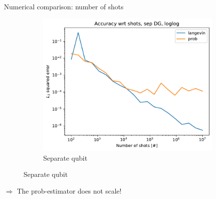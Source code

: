 \documentclass{beamer}
\begin{document}
\begin{frame}{Numerical comparison: number of shots}
\begin{figure}[H]
\begin{subfigure}[b]{0.49\textwidth}
            \includegraphics[width=\textwidth]{figures/experiments/shots/shots_acc_comp_shots_exp_sep_loglog-1.png}
    
            \caption{Separate qubit}
    
            \label{fig:shots-comp-sep-sub}
    
        \end{subfigure}
        
        \label{fig:shots-comp}
    
    \end{figure}
    $\Longrightarrow$ The prob-estimator does not scale!
\end{frame}
\end{document}
